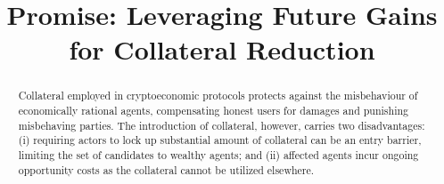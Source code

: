 \documentclass[runningheads]{llncs}
\newcommand{\sys}{Promise\xspace}
\begin{document}
\title{
\sys: Leveraging Future Gains for Collateral Reduction
} 
\author{
\institute{}
}


\date{}
\maketitle


\begin{abstract}
Collateral employed in cryptoeconomic protocols protects against the misbehaviour of economically rational agents, compensating honest users for damages and punishing misbehaving parties.
The introduction of collateral, however, carries two disadvantages: (i) requiring actors to lock up substantial amount of collateral can be an entry barrier, limiting the set of candidates to wealthy agents; and (ii) affected agents incur ongoing opportunity costs as the collateral cannot be utilized elsewhere.


\end{abstract}
\end{document}
